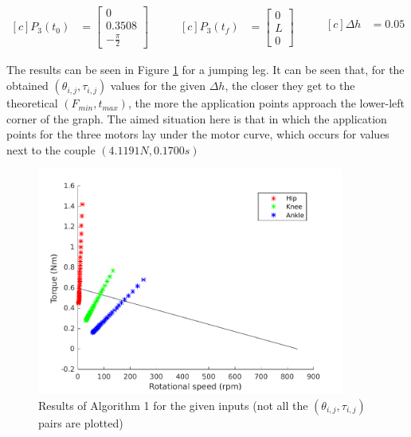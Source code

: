 \begin{equation*}
\label{eq:input_a1}
\begin{aligned}[c]
P_{3}(t_{0}) &= \left[\!
				    \begin{array}{c}
				      0 \\
				      0.3508 \\
				      -\frac{\pi}{2}
				    \end{array}
				  \!\right]
\end{aligned}
\qquad
\begin{aligned}[c]
P_{3}(t_{f}) &= \left[\!
				    \begin{array}{c}
				      0 \\
				      L \\
				      0
				    \end{array}
				  \!\right]
\end{aligned}
\qquad
\begin{aligned}[c]
\Delta h &= 0.05 \\
\end{aligned}
\end{equation*}

The results can be seen in Figure \ref{fig:alg1_results} for a jumping leg.
It can be seen that, for the obtained $(\theta_{i,j}, \tau_{i,j})$ values for the given $\Delta h$, the closer they get to the theoretical $(F_{min}, t_{max})$, the more the application points approach the lower-left corner of the graph.
The aimed situation here is that in which the application points for the three motors lay under the motor curve, which occurs for values next to the couple $(4.1191N, 0.1700s)$

\begin{figure}[htb]
	\centering
	\includegraphics[width=0.9\textwidth]{figures/algorithm1.pdf}
	\caption{Results of Algorithm 1 for the given inputs (not all the $(\theta_{i,j}, \tau_{i,j})$ pairs are plotted)}
	\label{fig:alg1_results}
\end{figure}

